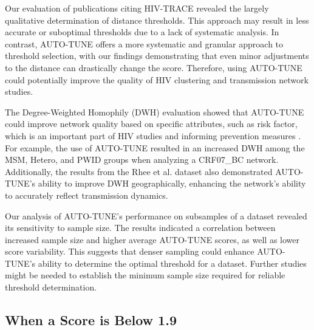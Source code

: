 \documentclass[utf8]{FrontiersinHarvard} %
\newcommand{\TODO}[1]{{\color{red}{#1}}}
\begin{document}
Our evaluation of publications citing HIV-TRACE revealed the largely
qualitative determination of distance thresholds. This approach may result in
less accurate or suboptimal thresholds due to a lack of systematic analysis. In
contrast, AUTO-TUNE offers a more systematic and granular approach to threshold
selection, with our findings demonstrating that even minor adjustments to the
distance can drastically change the score. Therefore, using AUTO-TUNE could
potentially improve the quality of HIV clustering and transmission network
studies.

The Degree-Weighted Homophily (DWH) evaluation showed that AUTO-TUNE could
improve network quality based on specific attributes, such as risk factor,
which is an important part of HIV studies and informing prevention measures
\citep{potterat_risk_2002,fujimoto_methodological_2021}. For example, the use of
AUTO-TUNE resulted in an increased DWH among the MSM, Hetero, and PWID groups
when analyzing a CRF07\_BC network. Additionally, the results from the Rhee et
al. dataset also demonstrated AUTO-TUNE's ability to improve DWH
geographically, enhancing the network's ability to accurately reflect
transmission dynamics.

Our analysis of AUTO-TUNE's performance on subsamples of a dataset revealed its
sensitivity to sample size. The results indicated a correlation between
increased sample size and higher average AUTO-TUNE scores, as well as lower
score variability. This suggests that denser sampling could enhance AUTO-TUNE's
ability to determine the optimal threshold for a dataset. Further studies might
be needed to establish the minimum sample size required for reliable threshold
determination.

\subsection{When a Score is Below 1.9}

\TODO{add some text to explain that multiple scores at different thresholds could be indicative of inherently different scales in the network, e.g. global AND local combined into one}
\end{document}
